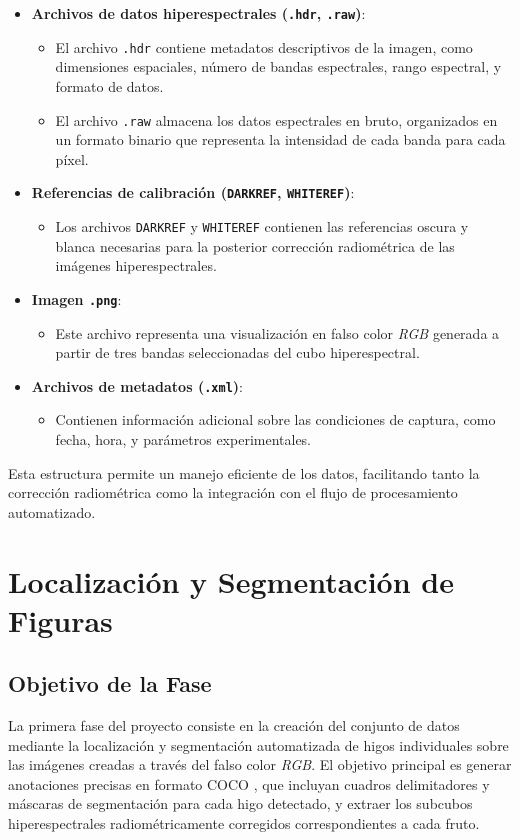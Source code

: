 \begin{itemize}
    \item \textbf{Archivos de datos hiperespectrales (\texttt{.hdr}, \texttt{.raw})}: 
    \begin{itemize}
        \item El archivo \texttt{.hdr} contiene metadatos descriptivos de la imagen, como dimensiones espaciales, número de bandas espectrales, rango espectral, y formato de datos.
        \item El archivo \texttt{.raw} almacena los datos espectrales en bruto, organizados en un formato binario que representa la intensidad de cada banda para cada píxel.
    \end{itemize}
    \item \textbf{Referencias de calibración (\texttt{DARKREF}, \texttt{WHITEREF})}: 
    \begin{itemize}
        \item Los archivos \texttt{DARKREF} y \texttt{WHITEREF} contienen las referencias oscura y blanca necesarias para la posterior corrección radiométrica de las imágenes hiperespectrales.
    \end{itemize}
    \item \textbf{Imagen \texttt{.png}}: 
    \begin{itemize}
        \item Este archivo representa una visualización en falso color \emph{RGB} generada a partir de tres bandas seleccionadas del cubo hiperespectral.
    \end{itemize}
    \item \textbf{Archivos de metadatos (\texttt{.xml})}: 
    \begin{itemize}
        \item Contienen información adicional sobre las condiciones de captura, como fecha, hora, y parámetros experimentales.
    \end{itemize}
\end{itemize}

Esta estructura permite un manejo eficiente de los datos, facilitando tanto la corrección radiométrica como la integración con el flujo de procesamiento automatizado.


\section{Localización y Segmentación de Figuras}

\subsection{Objetivo de la Fase}
La primera fase del proyecto consiste en la creación del conjunto de datos mediante la localización y segmentación automatizada de higos individuales sobre las imágenes creadas a través del falso color \emph{RGB}. El objetivo principal es generar anotaciones precisas en formato COCO \cite{lin2015microsoftcococommonobjects}, que incluyan cuadros delimitadores y máscaras de segmentación para cada higo detectado, y extraer los subcubos hiperespectrales radiométricamente corregidos correspondientes a cada fruto.

